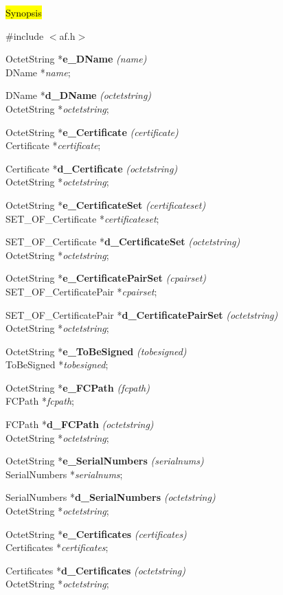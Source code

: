 \hl{Synopsis}

\#include $<$af.h$>$ 

OctetString *{\bf e\_DName} {\em (name)} \\
DName *{\em name};

DName *{\bf d\_DName} {\em (octetstring)} \\
OctetString *{\em octetstring};

OctetString *{\bf e\_Certificate} {\em (certificate)} \\
Certificate *{\em certificate};

Certificate *{\bf d\_Certificate} {\em (octetstring)} \\
OctetString *{\em octetstring};

OctetString *{\bf e\_CertificateSet} {\em (certificateset)} \\
SET\_OF\_Certificate *{\em certificateset};

SET\_OF\_Certificate *{\bf d\_CertificateSet} {\em (octetstring)} \\
OctetString *{\em octetstring};

OctetString *{\bf e\_CertificatePairSet} {\em (cpairset)} \\
SET\_OF\_CertificatePair *{\em cpairset};

SET\_OF\_CertificatePair *{\bf d\_CertificatePairSet} {\em (octetstring)} \\
OctetString *{\em octetstring};

OctetString *{\bf e\_ToBeSigned} {\em (tobesigned)} \\
ToBeSigned *{\em tobesigned};

OctetString *{\bf e\_FCPath} {\em (fcpath)} \\
FCPath *{\em fcpath};

FCPath *{\bf d\_FCPath} {\em (octetstring)} \\
OctetString *{\em octetstring};

OctetString *{\bf e\_SerialNumbers} {\em (serialnums)} \\
SerialNumbers *{\em serialnums};

SerialNumbers *{\bf d\_SerialNumbers} {\em (octetstring)} \\
OctetString *{\em octetstring};

OctetString *{\bf e\_Certificates} {\em (certificates)} \\
Certificates *{\em certificates};

Certificates *{\bf d\_Certificates} {\em (octetstring)} \\
OctetString *{\em octetstring};

